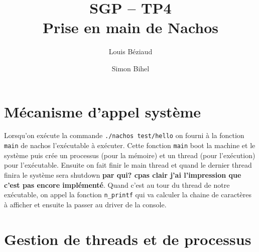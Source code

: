 \documentclass{article}
\title{SGP -- TP4\\Prise en main de Nachos}
\author{Louis Béziaud \and Simon Bihel}
\begin{document}
\maketitle

\section{Mécanisme d'appel système}
Lorsqu'on exécute la commande {\tt ./nachos test/hello} on fourni à la fonction {\tt main} de nachos l'exécutable à exécuter. Cette fonction {\tt main} boot la machine et le système puis crée un processus (pour la mémoire) et un thread (pour l'exécution) pour l'exécutable. Ensuite on fait finir le main thread et quand le dernier thread finira le système sera shutdown {\bf par qui? cpas clair j'ai l'impression que c'est pas encore implémenté}. Quand c'est au tour du thread de notre exécutable, on appel la fonction {\tt n\_printf} qui va calculer la chaine de caractères à afficher et ensuite la passer au driver de la console.

\section{Gestion de threads et de processus}
\end{document}
